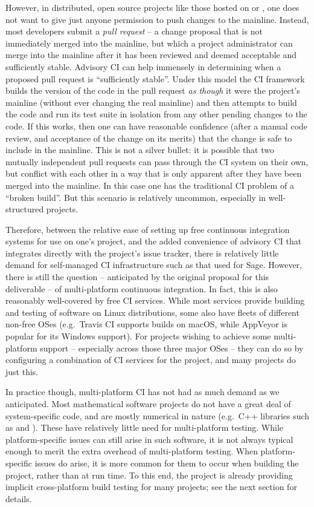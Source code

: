 \documentclass{deliverablereport}
\begin{document}
However, in distributed, open source projects like those hosted on \GitHub or
\GitLab, one does not want to give just anyone permission to push changes to
the mainline.  Instead, most developers submit a {\em pull request} -- a change
proposal that is not immediately merged into the mainline, but which a project
administrator can merge into the mainline after it has been reviewed and
deemed acceptable and sufficiently stable.  Advisory CI can help immensely in
determining when a proposed pull request is ``sufficiently stable''.  Under
this model the CI framework builds the version of the code in the pull request
{\em as though} it were the project's mainline (without ever changing the real
mainline) and then attempts to build the code and run its test suite in isolation
from any other pending changes to the code.  If this works, then one can have
reasonable confidence (after a manual code review, and acceptance of the change
on its merits) that the change is safe to include in the mainline.  This is not
a silver bullet: it is possible that two mutually independent pull requests can
pass through the CI system on their own, but conflict with each other in a way
that is only apparent after they have been merged into the mainline.  In this
case one has the traditional CI problem of a ``broken build''.  But this scenario
is relatively uncommon, especially in well-structured projects.

Therefore, between the relative ease of setting up free continuous integration
systems for use on one's project, and the added convenience of advisory CI that
integrates directly with the project's issue tracker, there is relatively
little demand for self-managed CI infrastructure such as that used for Sage.
However, there is still the question -- anticipated by the original proposal
for this deliverable -- of multi-platform continuous integration.  In fact,
this is also reasonably well-covered by free CI services.  While most services
provide building and testing of software on Linux distributions, some also have
fleets of different non-free OSes (e.g.~Travis CI supports builds on macOS,
while AppVeyor is popular for its Windows support).  For projects wishing to
achieve some multi-platform support -- especially across those three major OSes
-- they can do so by configuring a combination of CI services for the project,
and many projects do just this.

In practice though, multi-platform CI has not had as much demand as we
anticipated.  Most mathematical software projects do not have a great deal of
system-specific code, and are mostly numerical in nature (e.g.~C++ libraries
such as \Linbox and \Givaro).  These have relatively little need for
multi-platform testing.  While platform-specific issues can still arise in such
software, it is not always typical enough to merit the extra overhead of
multi-platform testing.  When platform-specific issues do arise, it is more
common for them to occur when building the project, rather than at run time.
To this end, the \Sage project is already providing implicit cross-platform
build testing for many projects; see the next section for details.
\end{document}
